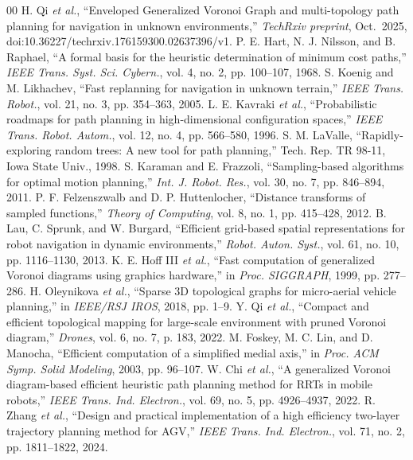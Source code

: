 \documentclass[conference]{IEEEtran}
\begin{document}
\begin{thebibliography}{00}
 H. Qi \emph{et al.}, ``Enveloped Generalized Voronoi Graph and multi-topology path planning for navigation in unknown environments,'' \textit{TechRxiv preprint}, Oct.\ 2025, doi:10.36227/techrxiv.176159300.02637396/v1.
 P. E. Hart, N. J. Nilsson, and B. Raphael, ``A formal basis for the heuristic determination of minimum cost paths,'' \textit{IEEE Trans. Syst. Sci. Cybern.}, vol. 4, no. 2, pp. 100--107, 1968.
 S. Koenig and M. Likhachev, ``Fast replanning for navigation in unknown terrain,'' \textit{IEEE Trans. Robot.}, vol. 21, no. 3, pp. 354--363, 2005.
 L. E. Kavraki \emph{et al.}, ``Probabilistic roadmaps for path planning in high-dimensional configuration spaces,'' \textit{IEEE Trans. Robot. Autom.}, vol. 12, no. 4, pp. 566--580, 1996.
 S. M. LaValle, ``Rapidly-exploring random trees: A new tool for path planning,'' Tech. Rep. TR 98-11, Iowa State Univ., 1998.
 S. Karaman and E. Frazzoli, ``Sampling-based algorithms for optimal motion planning,'' \textit{Int. J. Robot. Res.}, vol. 30, no. 7, pp. 846--894, 2011.
 P. F. Felzenszwalb and D. P. Huttenlocher, ``Distance transforms of sampled functions,'' \textit{Theory of Computing}, vol. 8, no. 1, pp. 415--428, 2012.
 B. Lau, C. Sprunk, and W. Burgard, ``Efficient grid-based spatial representations for robot navigation in dynamic environments,'' \textit{Robot. Auton. Syst.}, vol. 61, no. 10, pp. 1116--1130, 2013.
 K. E. Hoff III \emph{et al.}, ``Fast computation of generalized Voronoi diagrams using graphics hardware,'' in \textit{Proc. SIGGRAPH}, 1999, pp. 277--286.
 H. Oleynikova \emph{et al.}, ``Sparse 3D topological graphs for micro-aerial vehicle planning,'' in \textit{IEEE/RSJ IROS}, 2018, pp. 1--9.
 Y. Qi \emph{et al.}, ``Compact and efficient topological mapping for large-scale environment with pruned Voronoi diagram,'' \textit{Drones}, vol. 6, no. 7, p. 183, 2022.
 M. Foskey, M. C. Lin, and D. Manocha, ``Efficient computation of a simplified medial axis,'' in \textit{Proc. ACM Symp. Solid Modeling}, 2003, pp. 96--107.
 W. Chi \emph{et al.}, ``A generalized Voronoi diagram-based efficient heuristic path planning method for RRTs in mobile robots,'' \textit{IEEE Trans. Ind. Electron.}, vol. 69, no. 5, pp. 4926--4937, 2022.
 R. Zhang \emph{et al.}, ``Design and practical implementation of a high efficiency two-layer trajectory planning method for AGV,'' \textit{IEEE Trans. Ind. Electron.}, vol. 71, no. 2, pp. 1811--1822, 2024.

\end{thebibliography}
\end{document}
